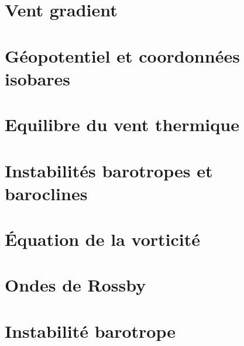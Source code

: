 \documentclass[a4paper,DIV16,10pt]{scrartcl}
\begin{document}

\newpage \section{Vent gradient} 

\newpage \section{Géopotentiel et coordonnées isobares} 

\newpage \section{Equilibre du vent thermique} 

\newpage \section{Instabilités barotropes et baroclines} 

\newpage \section{\'Equation de la vorticité} 

\newpage \section{Ondes de Rossby} 


\newpage \section{Instabilité barotrope} 
\end{document}
